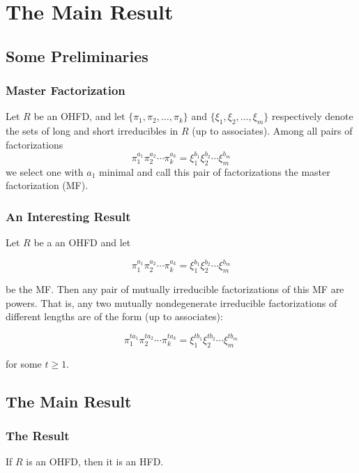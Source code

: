 \section{The Main Result}

\subsection{Some Preliminaries }

\begin{frame}
  \frametitle{Master Factorization }
  \begin{definition}
    Let $R$ be an OHFD, and let $\{\pi_{1},\pi_{2},\ldots,\pi_{k}\}$ and $\{\xi_{1},\xi_{2},\ldots,\xi_{m}\}$ respectively denote the sets of long and short irreducibles in $R$ (up to associates).
    Among all pairs of factorizations
      $$\pi_{1}^{a_{1}}\pi_{2}^{a_{2}}\cdots\pi_{k}^{a_{k}}=  \xi_{1}^{b_{1}}\xi_{2}^{b_{2}}\cdots\xi_{m}^{b_{m}}$$
    we select one with $a_{1}$ minimal and call this pair of factorizations the \alert{master factorization (MF)}.
  \end{definition}
\end{frame}

\begin{frame}
  \frametitle{An Interesting Result }
  \begin{fact}
    Let $R$ be a an OHFD and let

      $$\pi_{1}^{a_{1}}\pi_{2}^{a_{2}}\cdots\pi_{k}^{a_{k}}=  \xi_{1}^{b_{1}}\xi_{2}^{b_{2}}\cdots\xi_{m}^{b_{m}}$$

    be the MF.
    Then any pair of mutually irreducible factorizations of this MF are powers.
    That is, any two mutually nondegenerate irreducible factorizations of different lengths are of the form (up to associates):

      $$\pi_{1}^{ta_{1}}\pi_{2}^{ta_{2}}\cdots\pi_{k}^{ta_{k}}=  \xi_{1}^{tb_{1}}\xi_{2}^{tb_{2}}\cdots\xi_{m}^{tb_{m}}$$

    for some $t\geq1$.
  \end{fact}
\end{frame}

\subsection{The Main Result}
\begin{frame}
  \frametitle{The Result}
  \begin{theorem}
    If $R$ is an OHFD, then it is an HFD.
  \end{theorem}
\end{frame}

